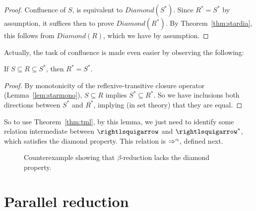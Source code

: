 \begin{proof}
  Confluence
  of $S$, is equivalent to $\textit{Diamond}(S^*)$.  Since $R^* = S^*$ by assumption, it suffices
  then to prove $\textit{Diamond}(R^*)$.  By Theorem~\ref{thm:stardia}, this follows
  from $\textit{Diamond}(R)$, which we have by assumption.
\end{proof}

Actually, the task of confluence is made even easier by observing the following:
\begin{lemma}
  If $S \subseteq R \subseteq S^*$, then $R^* = S^*$.
\end{lemma}
\begin{proof}
  By monotonicity of the reflexive-transitive closure operator (Lemma~\ref{lem:starmono}),
  $S \subseteq R$ implies $S^* \subseteq R^*$.  So we have inclusions both directions
  between $S^*$ and $R^*$, implying (in set theory) that they are equal.
  \end{proof}

\noindent So to use Theorem~\ref{thm:tml}, by this lemma, we just need to identify some relation
intermediate between $\betaa$ and $\betaa^*$, which satisfies the diamond property.  This relation
is $\Rightarrow^\alpha$, defined next.

\begin{figure}

  \begin{center}
    \end{center}

\caption{Counterexample showing that $\beta$-reduction lacks the diamond property.}
\label{fig:betanodia}

\end{figure}

\section{Parallel reduction}


